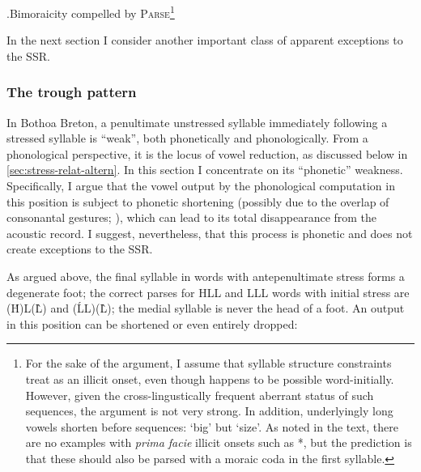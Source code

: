 \ex.\label{dreista-tableau}Bimoraicity compelled by \textsc{Parse}\footnote{\label{fn:st-onset}For the sake of the argument, I assume that syllable structure constraints treat \ipa{[st]} as an illicit onset, even though \ipa{[st]} happens to be possible word-initially. However, given the cross-lingustically frequent aberrant status of such sequences, the argument is not very strong. In addition, underlyingly long vowels shorten before \ipa{[st]} sequences: \ipa{[ˈbraːz̥]} `big' but \ipa{[ˈbrastər]} `size'. As noted in the text, there are no examples with \emph{prima facie} illicit onsets such as *\ipa{[drəilta]}, but the prediction is that these should also be parsed with a moraic coda in the first syllable.}\\
\begin{OTtableau}{3}
\end{OTtableau}

In the next section I consider another important class of apparent exceptions to the SSR.

\subsubsection{The trough pattern}
\label{sec:trough-pattern}

In Bothoa Breton, a penultimate unstressed syllable immediately following a stressed syllable is \enquote{weak}, both phonetically and phonologically. From a phonological perspective, it is the locus of vowel reduction, as discussed below in \cref{sec:stress-relat-altern}. In this section I concentrate on its \enquote{phonetic} weakness. Specifically, I argue that the vowel \ipa{[ə]} output by the phonological computation in this position is subject to phonetic shortening (possibly due to the overlap of consonantal gestures; \citealp{browgold90}), which can lead to its total disappearance from the acoustic record. I suggest, nevertheless, that this process is phonetic and does not create exceptions to the SSR.

As argued above, the final syllable in words with antepenultimate stress forms a degenerate foot; the correct parses for HLL and LLL words with initial stress are (\'H)L(\`L) and (\'LL)(\`L); the medial syllable is never the head of a foot. An output \ipa{[ə]} in this position can be shortened or even entirely dropped:

